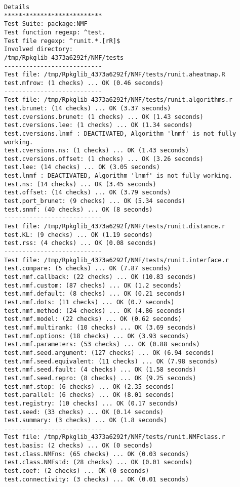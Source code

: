 \documentclass[10pt]{article}
\begin{document}
\begin{verbatim}
Details 
*************************** 
Test Suite: package:NMF 
Test function regexp: ^test. 
Test file regexp: ^runit.*.[rR]$ 
Involved directory: 
/tmp/Rpkglib_4373a6292f/NMF/tests 
--------------------------- 
Test file: /tmp/Rpkglib_4373a6292f/NMF/tests/runit.aheatmap.R 
test.mfrow: (1 checks) ... OK (0.46 seconds)
--------------------------- 
Test file: /tmp/Rpkglib_4373a6292f/NMF/tests/runit.algorithms.r 
test.brunet: (14 checks) ... OK (3.37 seconds)
test.cversions.brunet: (1 checks) ... OK (1.43 seconds)
test.cversions.lee: (1 checks) ... OK (1.34 seconds)
test.cversions.lnmf : DEACTIVATED, Algorithm 'lnmf' is not fully working.
test.cversions.ns: (1 checks) ... OK (1.43 seconds)
test.cversions.offset: (1 checks) ... OK (3.26 seconds)
test.lee: (14 checks) ... OK (3.05 seconds)
test.lnmf : DEACTIVATED, Algorithm 'lnmf' is not fully working.
test.ns: (14 checks) ... OK (3.45 seconds)
test.offset: (14 checks) ... OK (3.79 seconds)
test.port_brunet: (9 checks) ... OK (5.34 seconds)
test.snmf: (40 checks) ... OK (8 seconds)
--------------------------- 
Test file: /tmp/Rpkglib_4373a6292f/NMF/tests/runit.distance.r 
test.KL: (9 checks) ... OK (1.19 seconds)
test.rss: (4 checks) ... OK (0.08 seconds)
--------------------------- 
Test file: /tmp/Rpkglib_4373a6292f/NMF/tests/runit.interface.r 
test.compare: (5 checks) ... OK (7.87 seconds)
test.nmf.callback: (22 checks) ... OK (10.83 seconds)
test.nmf.custom: (87 checks) ... OK (1.2 seconds)
test.nmf.default: (8 checks) ... OK (0.21 seconds)
test.nmf.dots: (11 checks) ... OK (0.7 seconds)
test.nmf.method: (24 checks) ... OK (4.86 seconds)
test.nmf.model: (22 checks) ... OK (0.62 seconds)
test.nmf.multirank: (10 checks) ... OK (3.69 seconds)
test.nmf.options: (18 checks) ... OK (3.93 seconds)
test.nmf.parameters: (53 checks) ... OK (0.88 seconds)
test.nmf.seed.argument: (127 checks) ... OK (6.94 seconds)
test.nmf.seed.equivalent: (11 checks) ... OK (7.98 seconds)
test.nmf.seed.fault: (4 checks) ... OK (1.58 seconds)
test.nmf.seed.repro: (8 checks) ... OK (9.25 seconds)
test.nmf.stop: (6 checks) ... OK (2.35 seconds)
test.parallel: (6 checks) ... OK (8.01 seconds)
test.registry: (10 checks) ... OK (0.17 seconds)
test.seed: (33 checks) ... OK (0.14 seconds)
test.summary: (3 checks) ... OK (1.8 seconds)
--------------------------- 
Test file: /tmp/Rpkglib_4373a6292f/NMF/tests/runit.NMFclass.r 
test.basis: (2 checks) ... OK (0 seconds)
test.class.NMFns: (65 checks) ... OK (0.03 seconds)
test.class.NMFstd: (28 checks) ... OK (0.01 seconds)
test.coef: (2 checks) ... OK (0 seconds)
test.connectivity: (3 checks) ... OK (0.01 seconds)

\end{verbatim}
\end{document}
